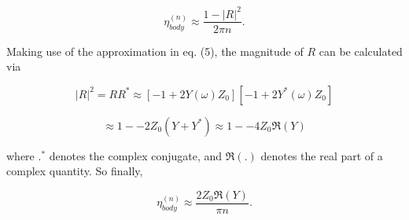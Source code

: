   \begin{equation*}\eta^{(n)}_{body} \approx \dfrac{1-|R|^2}{2 \pi n} . 
  \tag{6}\end{equation*} 

  Making use of the approximation in eq. (5), the magnitude of $R$ can be 
  calculated via 

  \begin{equation*}|R|^2=R R^* \approx [-1+2Y(\omega) Z_0] [-1+2Y^*(\omega) 
  Z_0]\end{equation*} 

  \begin{equation*}\approx 1 -- 2 Z_0 (Y + Y^*) \approx 1 -- 4 Z_0 
  \Re(Y)\tag{7}\end{equation*} 

  \noindent{}where $.^*$ denotes the complex conjugate, and $\Re(.)$ denotes 
  the real part of a complex quantity. So finally, 

  \begin{equation*}\eta^{(n)}_{body} \approx \dfrac{2 Z_0 \Re(Y)}{ \pi n} . 
  \tag{8}\end{equation*} 